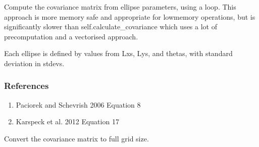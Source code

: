 \documentclass[letterpaper,10pt,english]{sphinxmanual}
\begin{document}
\begin{fulllineitems}
\begin{fulllineitems}
\end{fulllineitems}


\begin{fulllineitems}
\label{\detokenize{ellipse:glomar_gridding.ellipse.EllipseCovarianceBuilder.calculate_covariance_loop}}
\pysigstartsignatures
\pysiglinewithargsret
{}
{}
{}
\pysigstopsignatures
\sphinxAtStartPar
Compute the covariance matrix from ellipse parameters, using a loop.
This approach is more memory safe and appropriate for low\sphinxhyphen{}memory
operations, but is significantly slower than self.calculate\_covariance
which uses a lot of pre\sphinxhyphen{}computation and a vectorised approach.

\sphinxAtStartPar
Each ellipse is defined by values from Lxs, Lys, and thetas, with
standard deviation in stdevs.
\begin{quote}\begin{description}
\sphinxAtStartPar
{}

\end{description}\end{quote}
\subsubsection*{References}
\begin{enumerate}
%
\item {}
\sphinxAtStartPar
Paciorek and Schevrish 2006  Equation 8

\item {}
\sphinxAtStartPar
Karspeck et al. 2012  Equation 17

\end{enumerate}

\end{fulllineitems}


\begin{fulllineitems}
\label{\detokenize{ellipse:glomar_gridding.ellipse.EllipseCovarianceBuilder.uncompress_cov}}
\pysigstartsignatures
\pysiglinewithargsret
{}
{\sphinxparamcomma {}}
{}
\pysigstopsignatures
\sphinxAtStartPar
Convert the covariance matrix to full grid size.


\end{fulllineitems}
\end{fulllineitems}
\end{document}
